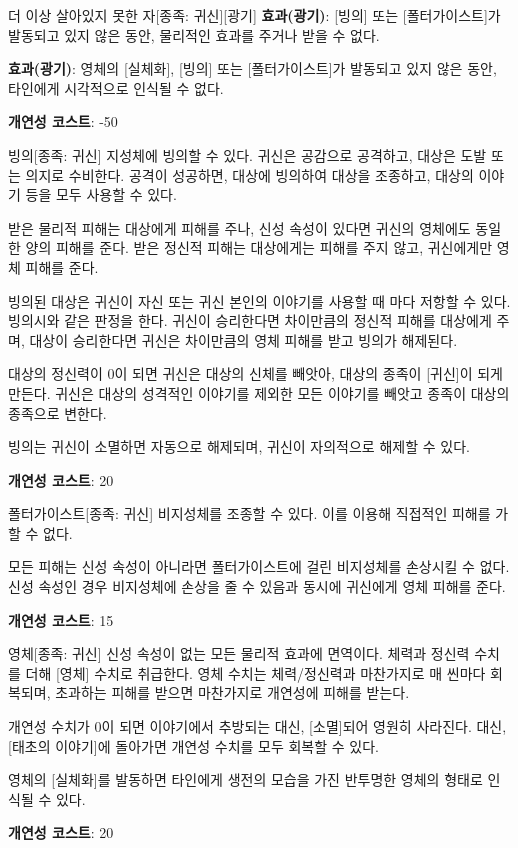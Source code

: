 \documentclass{report}
\begin{document}
	\begin{story}{더 이상 살아있지 못한 자}{[종족: 귀신][광기]}
		\textbf{효과(광기)}: [빙의] 또는 [폴터가이스트]가 발동되고 있지 않은 동안, 물리적인 효과를 주거나 받을 수 없다.
		
		\textbf{효과(광기)}: 영체의 [실체화], [빙의] 또는 [폴터가이스트]가 발동되고 있지 않은 동안, 타인에게 시각적으로 인식될 수 없다.
		
		\smallskip
		
		\textbf{개연성 코스트}: -50
	\end{story}
	
	\begin{story}{빙의}{[종족: 귀신]}
		지성체에 빙의할 수 있다. 귀신은 공감으로 공격하고, 대상은 도발 또는 의지로 수비한다. 공격이 성공하면, 대상에 빙의하여 대상을 조종하고, 대상의 이야기 등을 모두 사용할 수 있다.
		
		받은 물리적 피해는 대상에게 피해를 주나, 신성 속성이 있다면 귀신의 영체에도 동일한 양의 피해를 준다. 받은 정신적 피해는 대상에게는 피해를 주지 않고, 귀신에게만 영체 피해를 준다.
		
		빙의된 대상은 귀신이 자신 또는 귀신 본인의 이야기를 사용할 때 마다 저항할 수 있다. 빙의시와 같은 판정을 한다. 귀신이 승리한다면 차이만큼의 정신적 피해를 대상에게 주며, 대상이 승리한다면 귀신은 차이만큼의 영체 피해를 받고 빙의가 해제된다.
		
		대상의 정신력이 0이 되면 귀신은 대상의 신체를 빼앗아, 대상의 종족이 [귀신]이 되게 만든다. 귀신은 대상의 성격적인 이야기를 제외한 모든 이야기를 빼앗고 종족이 대상의 종족으로 변한다.
		
		빙의는 귀신이 소멸하면 자동으로 해제되며, 귀신이 자의적으로 해제할 수 있다.
		
		\smallskip
		
		\textbf{개연성 코스트}: 20
	\end{story}
	
	\begin{story}{폴터가이스트}{[종족: 귀신]}
		비지성체를 조종할 수 있다. 이를 이용해 직접적인 피해를 가할 수 없다.
		
		모든 피해는 신성 속성이 아니라면 폴터가이스트에 걸린 비지성체를 손상시킬 수 없다. 신성 속성인 경우 비지성체에 손상을 줄 수 있음과 동시에 귀신에게 영체 피해를 준다.
		
		\smallskip
		
		\textbf{개연성 코스트}: 15
	\end{story}
	
	\begin{story}{영체}{[종족: 귀신]}
		신성 속성이 없는 모든 물리적 효과에 면역이다. 체력과 정신력 수치를 더해 [영체] 수치로 취급한다. 영체 수치는 체력/정신력과 마찬가지로 매 씬마다 회복되며, 초과하는 피해를 받으면 마찬가지로 개연성에 피해를 받는다.
		
		개연성 수치가 0이 되면 이야기에서 추방되는 대신, [소멸]되어 영원히 사라진다. 대신, [태초의 이야기]에 돌아가면 개연성 수치를 모두 회복할 수 있다.
		
		영체의 [실체화]를 발동하면 타인에게 생전의 모습을 가진 반투명한 영체의 형태로 인식될 수 있다.
		
		\smallskip
		
		\textbf{개연성 코스트}: 20
	\end{story}
\end{document}
